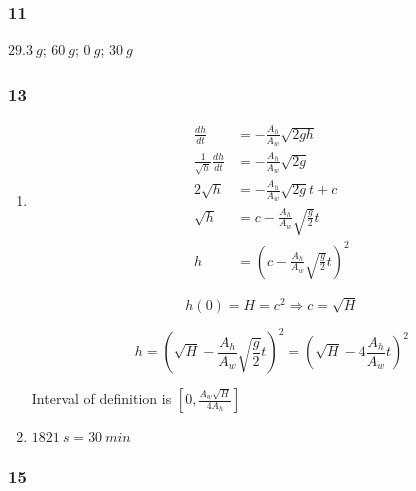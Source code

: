\documentclass{article}
\begin{document}
\subsubsection{11}

$\qty{29.3}{g}$; $\qty{60}{g}$; $\qty{0}{g}$; $\qty{30}{g}$

\subsubsection{13}

\begin{enumerate}
  \item

        \begin{align*}
          \frac{dh}{dt}                    & = -\frac{A_h}{A_w} \sqrt{2 g h}                             \\
          \frac{1}{\sqrt{h}} \frac{dh}{dt} & = -\frac{A_h}{A_w} \sqrt{2 g}                               \\
          2 \sqrt{h}                       & = -\frac{A_h}{A_w} \sqrt{2 g} t + c                         \\
          \sqrt{h}                         & = c - \frac{A_h}{A_w} \sqrt{\frac{g}{2}} t                  \\
          h                                & = \left( c - \frac{A_h}{A_w} \sqrt{\frac{g}{2}} t \right)^2
        \end{align*}

        \[h(0) = H = c^2 \Rightarrow c = \sqrt{H}\]

        \[h = \left( \sqrt{H} - \frac{A_h}{A_w} \sqrt{\frac{g}{2}} t \right)^2 = \left( \sqrt{H} - 4 \frac{A_h}{A_w} t \right)^2\]

        Interval of definition is $[0, \frac{A_w \sqrt{H}}{4 A_h}]$

  \item $\qty{1821}{s} = \qty{30}{min}$
\end{enumerate}

\subsubsection{15}
\end{document}
